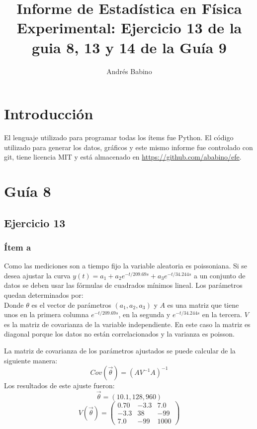 \title{Informe de Estadística en Física Experimental: Ejercicio 13 de la guia 8,  13 y 14 de la  Guía 9}
\author{Andrés Babino}


\maketitle
\section{Introducción}
El lenguaje utilizado para programar todas los ítems fue Python.
El código utilizado para generar los datos, gráficos y este mismo informe fue controlado con git, tiene licencia MIT y está almacenado en \url{https://github.com/ababino/efe}.

\section*{Guía 8}
\subsection*{Ejercicio 13}
\subsubsection*{Ítem a}
Como las mediciones son a tiempo fijo la variable aleatoria es poissoniana.
Si se desea ajustar la curva $y(t) = a_1 + a_2 e^{-t/209.69s} + a_3 e^{-t/34.244s}$ a un conjunto de datos se deben usar las fórmulas de cuadrados mínimos lineal.
Los parámetros quedan determinados por:
$$
$$
Donde $\theta$ es el vector de parámetros $(a_1, a_2, a_3)$ y $A$ es una matriz que tiene unos en la primera columna $e^{-t/209.69s}$, en la segunda y $e^{-t/34.244s}$ en la tercera.
$V$ es la matriz de covarianza de la variable independiente.
En este caso la matriz es diagonal porque los datos no están correlacionados y la varianza es poisson.

La matriz de covarianza de los parámetros ajustados se puede calcular de la siguiente manera:
$$
Cov(\vec{\theta}) = {(AV^{-1}A)}^{-1}
$$
Los resultados de este ajuste fueron:
$$
\vec{\theta} = (10.1, 128, 960)
$$
$$
V(\vec{\theta}) =\left(
\begin{matrix}
0.70 &-3.3 & 7.0 \\
-3.3 & 38 &-99 \\
7.0  & -99 & 1000
\end{matrix} \right)
$$

